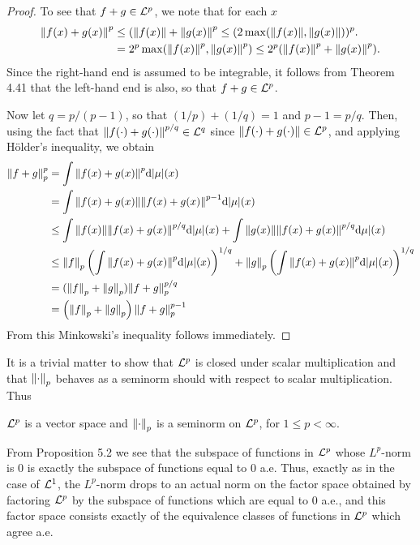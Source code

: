 \begin{proof}
To see that $f+g\in{\cal L}^p$, we note that for each $x$
\begin{align*}
\norm{f(x)+g(x)}^p&\leq(\norm{f(x)}+\norm{g(x)}^p\leq(2\max(\norm{f(x)},\norm{g(x)}))^p. \\
&=2^p \max(\norm{f(x)}^p,\norm{g(x)}^p)\leq2^p(\norm{f(x)}^p+\norm{g(x)}^p).
\end{align*}
Since the right-hand end is assumed to be integrable, it follows from Theorem 4.41 that the left-hand end is also, so that $f+g\in{\cal L}^p$.

Now let $q=p/(p-1)$, so that $(1/p)+(1/q)=1$ and $p-1=p/q$. Then, using the fact that $\norm{f(\cdot)+g(\cdot)}^{p/q}\in{\cal L}^q$ since $\norm{f(\cdot)+g(\cdot)}\in{\cal L}^p$, and applying H\"older's inequality, we obtain
\begin{align*}
    \norm{f+g}_p^p&=\int\norm{f(x)+g(x)}^p\dd|\mu|(x)\\
    &=\int\norm{f(x)+g(x)}\norm{f(x)+g(x)}^{p-1}\dd|\mu|(x)\\
    &\leq\int\norm{f(x)}\norm{f(x)+g(x)}^{p/q}\dd|\mu|(x)+\int\norm{g(x)}\norm{f(x)+g(x)}^{p/q}\dd\mu|(x)\\
    &\leq\norm{f}_p\left(\int\norm{f(x)+g(x)}^p\dd|\mu|(x)\right)^{1/q}+\norm{g}_p\left(\int\norm{f(x)+g(x)}^p\dd|\mu|(x)\right)^{1/q}\\
    &=(\norm{f}_p+\norm{g}_p)\norm{f+g}_p^{p/q}\\
    &=\left(\norm{f}_p+\norm{g}_p\right)\norm{f+g}_p^{p-1} 
\end{align*} From this Minkowski's inequality follows immediately.
\end{proof}

It is a trivial matter to show that ${\cal L}^p$ is closed under scalar multiplication and that $\norm{\cdot}_p$ behaves as a seminorm should with respect to scalar multiplication. Thus

\begin{corollary}
${\cal L}^p$ is a vector space and $\norm{\cdot}_p$ is a seminorm on ${\cal L}^p$, for $1\leq p<\infty$.
\end{corollary}

From Proposition 5.2 we see that the subspace of functions in ${\cal L}^p$ whose $L^p$-norm is 0 is exactly the subspace of functions equal to 0 a.e. Thus, exactly as in the case of ${\cal L}^1$, the $L^p$-norm drops to an actual norm on the factor space obtained by factoring ${\cal L}^p$ by the subspace of functions which are equal to 0 a.e., and this factor space consists exactly of the equivalence classes of functions in ${\cal L}^p$ which agree a.e.

